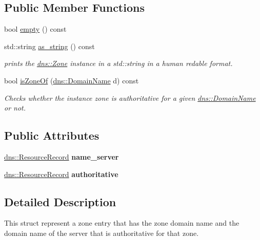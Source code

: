 \subsection*{Public Member Functions}
\begin{DoxyCompactItemize}
\item 
bool \hyperlink{structdns_1_1Zone_ad33a2d40f6301c559907d66f1c86d64e}{empty} () const 
\item 
std\+::string \hyperlink{structdns_1_1Zone_a424d36efa5adc9e4f4b7e6073ade3763}{as\+\_\+string} () const 
\begin{DoxyCompactList}\small\item\em prints the \hyperlink{structdns_1_1Zone}{dns\+::\+Zone} instance in a std\+::string in a human redable format. \end{DoxyCompactList}\item 
bool \hyperlink{structdns_1_1Zone_adbd4dcf69ed0f8ce57831b9231220463}{is\+Zone\+Of} (\hyperlink{structdns_1_1DomainName}{dns\+::\+Domain\+Name} d) const 
\begin{DoxyCompactList}\small\item\em Checks whether the instance zone is authoritative for a given \hyperlink{structdns_1_1DomainName}{dns\+::\+Domain\+Name} or not. \end{DoxyCompactList}\end{DoxyCompactItemize}
\subsection*{Public Attributes}
\begin{DoxyCompactItemize}
\item 
\hyperlink{structdns_1_1ResourceRecord}{dns\+::\+Resource\+Record} {\bfseries name\+\_\+server}\hypertarget{structdns_1_1Zone_ae9df275611f589f84e48c2f4bf05c751}{}\label{structdns_1_1Zone_ae9df275611f589f84e48c2f4bf05c751}

\item 
\hyperlink{structdns_1_1ResourceRecord}{dns\+::\+Resource\+Record} {\bfseries authoritative}\hypertarget{structdns_1_1Zone_a11cd8c23701e8f1a7e43d90a5cc51acc}{}\label{structdns_1_1Zone_a11cd8c23701e8f1a7e43d90a5cc51acc}

\end{DoxyCompactItemize}


\subsection{Detailed Description}
This struct represent a zone entry that has the zone domain name and the domain name of the server that is authoritative for that zone. 

